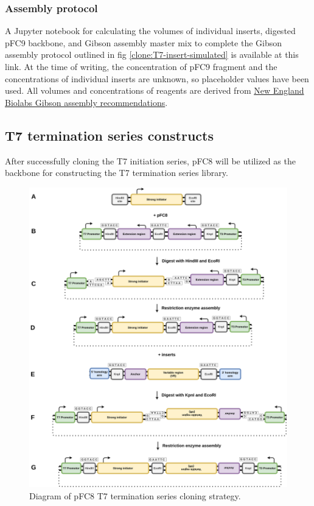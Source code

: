\documentclass[11pt]{article}
\begin{document}
\subsubsection{Assembly protocol}

A Jupyter notebook for calculating the volumes of individual inserts, digested pFC9 backbone, and Gibson assembly master mix to complete the Gibson assembly protocol outlined in fig \ref{clone:T7-insert-simulated} is available at this link. At the time of writing, the concentration of pFC9 fragment and the concentrations of individual inserts are unknown, so placeholder values have been used. All volumes and concentrations of reagents are derived from \href{https://www.neb.com/protocols/2012/12/11/gibson-assembly-protocol-e5510}{New England Biolabs Gibson assembly recommendations}.


\subsection{T7 termination series constructs}

After successfully cloning the T7 initiation series, pFC8 will be utilized as the backbone for constructing the T7 termination series library. 

\begin{figure}[H]
	\includegraphics[width=15cm]{images/cloning_diagrams/construct_diagrams-T7-termination-series.png}
	\centering
	\caption{Diagram of pFC8 T7 termination series cloning strategy.}
	\label{clone:T7-term}
	
\end{figure}
\end{document}
